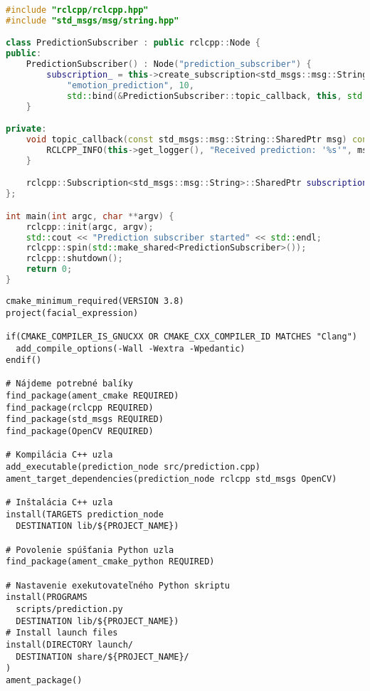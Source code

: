 \label{attachment:cpp_code}


\begin{lstlisting}[language=C++, caption={Implementácia rozpoznávania emócií v C++}, label={lst:emotion-cpp}]
#include "rclcpp/rclcpp.hpp"
#include "std_msgs/msg/string.hpp"

class PredictionSubscriber : public rclcpp::Node {
public:
    PredictionSubscriber() : Node("prediction_subscriber") {
        subscription_ = this->create_subscription<std_msgs::msg::String>(
            "emotion_prediction", 10,
            std::bind(&PredictionSubscriber::topic_callback, this, std::placeholders::_1));
    }

private:
    void topic_callback(const std_msgs::msg::String::SharedPtr msg) const {
        RCLCPP_INFO(this->get_logger(), "Received prediction: '%s'", msg->data.c_str());
    }

    rclcpp::Subscription<std_msgs::msg::String>::SharedPtr subscription_;
};

int main(int argc, char **argv) {
    rclcpp::init(argc, argv);
    std::cout << "Prediction subscriber started" << std::endl;
    rclcpp::spin(std::make_shared<PredictionSubscriber>());
    rclcpp::shutdown();
    return 0;
}
\end{lstlisting}

\begin{lstlisting}[style=cmakestyle, caption={CMakeLists.txt pre projekt rozpoznávania emócií}, label={lst:cmake}]
cmake_minimum_required(VERSION 3.8)
project(facial_expression)

if(CMAKE_COMPILER_IS_GNUCXX OR CMAKE_CXX_COMPILER_ID MATCHES "Clang")
  add_compile_options(-Wall -Wextra -Wpedantic)
endif()

# Nájdeme potrebné balíky
find_package(ament_cmake REQUIRED)
find_package(rclcpp REQUIRED)
find_package(std_msgs REQUIRED)
find_package(OpenCV REQUIRED)

# Kompilácia C++ uzla
add_executable(prediction_node src/prediction.cpp)
ament_target_dependencies(prediction_node rclcpp std_msgs OpenCV)

# Inštalácia C++ uzla
install(TARGETS prediction_node
  DESTINATION lib/${PROJECT_NAME})

# Povolenie spúšťania Python uzla
find_package(ament_cmake_python REQUIRED)

# Nastavenie exekutovateľného Python skriptu
install(PROGRAMS
  scripts/prediction.py
  DESTINATION lib/${PROJECT_NAME})
# Install launch files
install(DIRECTORY launch/
  DESTINATION share/${PROJECT_NAME}/
)
ament_package()
\end{lstlisting}
